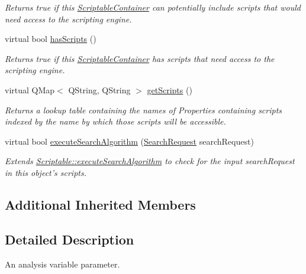 \begin{DoxyCompactItemize}
\begin{DoxyCompactList}\small\item\em Returns true if this \hyperlink{class_picto_1_1_scriptable_container}{Scriptable\-Container} can potentially include scripts that would need access to the scripting engine. \end{DoxyCompactList}\item 
virtual bool \hyperlink{class_picto_1_1_analysis_script_holder_a3ff34c1c1c1a0461c068f961f6f29b0a}{has\-Scripts} ()
\begin{DoxyCompactList}\small\item\em Returns true if this \hyperlink{class_picto_1_1_scriptable_container}{Scriptable\-Container} has scripts that need access to the scripting engine. \end{DoxyCompactList}\item 
virtual Q\-Map$<$ Q\-String, Q\-String $>$ \hyperlink{class_picto_1_1_analysis_script_holder_aadde5d4100fddf0d32120b1a374d7507}{get\-Scripts} ()
\begin{DoxyCompactList}\small\item\em Returns a lookup table containing the names of Properties containing scripts indexed by the name by which those scripts will be accessible. \end{DoxyCompactList}\item 
\hypertarget{class_picto_1_1_analysis_script_holder_aacaedd6a2ec3fddeaa4c6b50f548a167}{virtual bool \hyperlink{class_picto_1_1_analysis_script_holder_aacaedd6a2ec3fddeaa4c6b50f548a167}{execute\-Search\-Algorithm} (\hyperlink{struct_search_request}{Search\-Request} search\-Request)}\label{class_picto_1_1_analysis_script_holder_aacaedd6a2ec3fddeaa4c6b50f548a167}

\begin{DoxyCompactList}\small\item\em Extends \hyperlink{class_picto_1_1_u_i_enabled_a97cb540bf9702a5af91a9eeddde39db9}{Scriptable\-::execute\-Search\-Algorithm} to check for the input search\-Request in this object's scripts. \end{DoxyCompactList}\end{DoxyCompactItemize}
\subsection*{Additional Inherited Members}


\subsection{Detailed Description}
An analysis variable parameter. 

